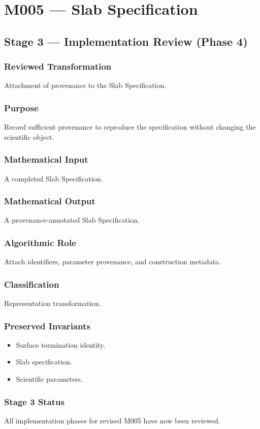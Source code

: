 \chapter{M005 --- Slab Specification}

\section{Stage 3 --- Implementation Review (Phase 4)}

\subsection{Reviewed Transformation}

Attachment of provenance to the Slab Specification.

\subsection{Purpose}

Record sufficient provenance to reproduce the specification without
changing the scientific object.

\subsection{Mathematical Input}

A completed Slab Specification.

\subsection{Mathematical Output}

A provenance-annotated Slab Specification.

\subsection{Algorithmic Role}

Attach identifiers, parameter provenance, and construction metadata.

\subsection{Classification}

Representation transformation.

\subsection{Preserved Invariants}

\begin{itemize}
\item Surface termination identity.
\item Slab specification.
\item Scientific parameters.
\end{itemize}

\subsection{Stage 3 Status}

All implementation phases for revised M005 have now been reviewed.
